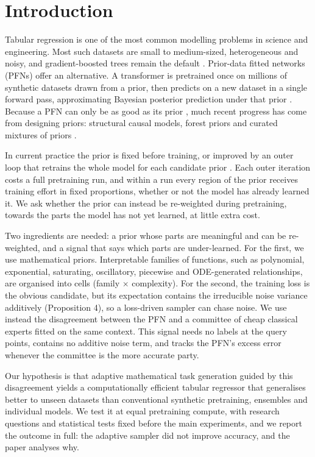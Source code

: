 \documentclass[mathematics,article,submit,pdftex,moreauthors]{Definitions/mdpi}
\begin{document}
\section{Introduction}

Tabular regression is one of the most common modelling problems in science and engineering. Most such datasets are small to medium-sized, heterogeneous and noisy, and gradient-boosted trees remain the default \cite{grinsztajn2022why,mcelfresh2023when}. Prior-data fitted networks (PFNs) offer an alternative. A transformer is pretrained once on millions of synthetic datasets drawn from a prior, then predicts on a new dataset in a single forward pass, approximating Bayesian posterior prediction under that prior \cite{muller2022transformers,hollmann2023tabpfn}. Because a PFN can only be as good as its prior \cite{nagler2023statistical}, much recent progress has come from designing priors: structural causal models, forest priors and curated mixtures of priors \cite{breejen2024fine,zhang2025mitra}.

In current practice the prior is fixed before training, or improved by an outer loop that retrains the whole model for each candidate prior \cite{zhang2025mitra}. Each outer iteration costs a full pretraining run, and within a run every region of the prior receives training effort in fixed proportions, whether or not the model has already learned it. We ask whether the prior can instead be re-weighted during pretraining, towards the parts the model has not yet learned, at little extra cost.

Two ingredients are needed: a prior whose parts are meaningful and can be re-weighted, and a signal that says which parts are under-learned. For the first, we use mathematical priors. Interpretable families of functions, such as polynomial, exponential, saturating, oscillatory, piecewise and ODE-generated relationships, are organised into cells (family $\times$ complexity). For the second, the training loss is the obvious candidate, but its expectation contains the irreducible noise variance additively (Proposition 4), so a loss-driven sampler can chase noise. We use instead the disagreement between the PFN and a committee of cheap classical experts fitted on the same context. This signal needs no labels at the query points, contains no additive noise term, and tracks the PFN's excess error whenever the committee is the more accurate party.

Our hypothesis is that adaptive mathematical task generation guided by this disagreement yields a computationally efficient tabular regressor that generalises better to unseen datasets than conventional synthetic pretraining, ensembles and individual models. We test it at equal pretraining compute, with research questions and statistical tests fixed before the main experiments, and we report the outcome in full: the adaptive sampler did not improve accuracy, and the paper analyses why.
\end{document}
